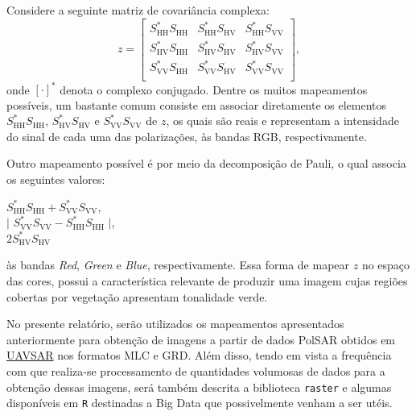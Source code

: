 \documentclass[12pt]{article}
\begin{document}
Considere a seguinte matriz de covariância complexa:
\[
z = 
\begin{bmatrix}
	S_{\text{HH}}^{\text{*}}S_{\text{HH}} & S_{\text{HH}}^{\text{*}}S_{\text{HV}} & S_{\text{HH}}^{\text{*}}S_{\text{VV}}\\
    S_{\text{HV}}^{\text{*}}S_{\text{HH}} & S_{\text{HV}}^{\text{*}}S_{\text{HV}} & S_{\text{HV}}^{\text{*}}S_{\text{VV}}\\
    S_{\text{VV}}^{\text{*}}S_{\text{HH}} & S_{\text{VV}}^{\text{*}}S_{\text{HV}} & S_{\text{VV}}^{\text{*}}S_{\text{VV}}\\
\end{bmatrix},
\]
onde $[\cdot]^{\text{*}}$ denota o complexo conjugado. Dentre os muitos mapeamentos possíveis, um bastante comum consiste em associar diretamente os elementos $S_{\text{HH}}^{\text{*}}S_{\text{HH}}$, $S_{\text{HV}}^{\text{*}}S_{\text{HV}}$ e $S_{\text{VV}}^{\text{*}}S_{\text{VV}}$ de $z$, os quais são reais e representam a intensidade do sinal de cada uma das polarizações\cite{Frery15}, às bandas RGB, respectivamente.

Outro mapeamento possível é por meio da decomposição de Pauli, o qual associa os seguintes valores:
\begin{center}
$S_{\text{HH}}^{\text{*}}S_{\text{HH}} + S_{\text{VV}}^{\text{*}}S_{\text{VV}}$, \\
$|$ $S_{\text{VV}}^{\text{*}}S_{\text{VV}} - S_{\text{HH}}^{\text{*}}S_{\text{HH}}$ $|$, \\
$2S_{\text{HV}}^{\text{*}}S_{\text{HV}}$ \\
\end{center}
às bandas \textit{Red}, \textit{Green} e \textit{Blue}, respectivamente. Essa forma de mapear $z$ no espaço das cores, possui a característica relevante de produzir uma imagem cujas regiões cobertas por vegetação apresentam tonalidade verde.

No presente relatório, serão utilizados os mapeamentos apresentados anteriormente para obtenção de imagens a partir de dados PolSAR obtidos em \href{https://uavsar.jpl.nasa.gov}{UAVSAR} nos formatos MLC e GRD. Além disso, tendo em vista a frequência com que realiza-se processamento de quantidades volumosas de dados para a obtenção dessas imagens, será também descrita a biblioteca \verb|raster| e algumas disponíveis em \texttt R destinadas a Big Data que possivelmente venham a ser utéis.
\end{document}
